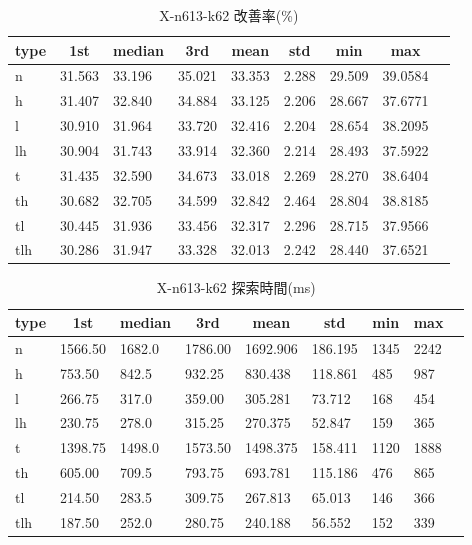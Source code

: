 \begin{table}[htbp]
    \caption{X-n613-k62 改善率(\%)}
    \begin{tabular}{|l|l|l|l|l|l|l|l|l|}\hline
    \multicolumn{1}{|c|}{\textbf{type}}
    &\multicolumn{1}{|c|}{\textbf{1st}}
    &\multicolumn{1}{c|}{\textbf{median}}
    &\multicolumn{1}{c|}{\textbf{3rd}}
    &\multicolumn{1}{c|}{\textbf{mean}}
    &\multicolumn{1}{c|}{\textbf{std}}
    &\multicolumn{1}{c|}{\textbf{min}}
    &\multicolumn{1}{c|}{\textbf{max}}\\\hline
	n & 31.563 & 33.196 & 35.021 & 33.353 & 2.288 & 29.509 & 39.0584\\\hline
	h & 31.407 & 32.840 & 34.884 & 33.125 & 2.206 & 28.667 & 37.6771\\\hline
	l & 30.910 & 31.964 & 33.720 & 32.416 & 2.204 & 28.654 & 38.2095\\\hline
	lh & 30.904 & 31.743 & 33.914 & 32.360 & 2.214 & 28.493 & 37.5922\\\hline
	t & 31.435 & 32.590 & 34.673 & 33.018 & 2.269 & 28.270 & 38.6404\\\hline
	th & 30.682 & 32.705 & 34.599 & 32.842 & 2.464 & 28.804 & 38.8185\\\hline
	tl & 30.445 & 31.936 & 33.456 & 32.317 & 2.296 & 28.715 & 37.9566\\\hline
	tlh & 30.286 & 31.947 & 33.328 & 32.013 & 2.242 & 28.440 & 37.6521\\\hline
	\end{tabular}
\end{table}
\begin{table}[htbp]
    \caption{X-n613-k62 探索時間(ms)}
    \begin{tabular}{|l|l|l|l|l|l|l|l|l|}\hline
    \multicolumn{1}{|c|}{\textbf{type}}
    &\multicolumn{1}{|c|}{\textbf{1st}}
    &\multicolumn{1}{c|}{\textbf{median}}
    &\multicolumn{1}{c|}{\textbf{3rd}}
    &\multicolumn{1}{c|}{\textbf{mean}}
    &\multicolumn{1}{c|}{\textbf{std}}
    &\multicolumn{1}{c|}{\textbf{min}}
    &\multicolumn{1}{c|}{\textbf{max}}\\\hline
	n & 1566.50 & 1682.0 & 1786.00 & 1692.906 & 186.195 & 1345 & 2242\\\hline
	h & 753.50 & 842.5 & 932.25 & 830.438 & 118.861 & 485 & 987\\\hline
	l & 266.75 & 317.0 & 359.00 & 305.281 & 73.712 & 168 & 454\\\hline
	lh & 230.75 & 278.0 & 315.25 & 270.375 & 52.847 & 159 & 365\\\hline
	t & 1398.75 & 1498.0 & 1573.50 & 1498.375 & 158.411 & 1120 & 1888\\\hline
	th & 605.00 & 709.5 & 793.75 & 693.781 & 115.186 & 476 & 865\\\hline
	tl & 214.50 & 283.5 & 309.75 & 267.813 & 65.013 & 146 & 366\\\hline
	tlh & 187.50 & 252.0 & 280.75 & 240.188 & 56.552 & 152 & 339\\\hline
	\end{tabular}
\end{table}
